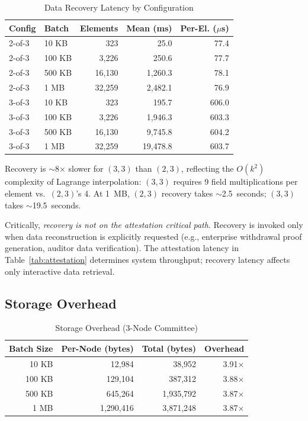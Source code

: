 \begin{table}[h]
\centering
\caption{Data Recovery Latency by Configuration}
\label{tab:recovery}
\begin{tabular}{llrrr}
\toprule
\textbf{Config} & \textbf{Batch} & \textbf{Elements} & \textbf{Mean (ms)} &
\textbf{Per-El. ($\mu$s)} \\
\midrule
2-of-3 & 10 KB  & 323    & 25.0     & 77.4  \\
2-of-3 & 100 KB & 3,226  & 250.6    & 77.7  \\
2-of-3 & 500 KB & 16,130 & 1,260.3  & 78.1  \\
2-of-3 & 1 MB   & 32,259 & 2,482.1  & 76.9  \\
\midrule
3-of-3 & 10 KB  & 323    & 195.7    & 606.0 \\
3-of-3 & 100 KB & 3,226  & 1,946.3  & 603.3 \\
3-of-3 & 500 KB & 16,130 & 9,745.8  & 604.2 \\
3-of-3 & 1 MB   & 32,259 & 19,478.8 & 603.7 \\
\bottomrule
\end{tabular}
\end{table}

Recovery is $\sim$8$\times$ slower for $(3,3)$ than $(2,3)$, reflecting the
$O(k^2)$ complexity of Lagrange interpolation: $(3,3)$ requires 9 field
multiplications per element vs.\ $(2,3)$'s 4. At 1~MB, $(2,3)$ recovery
takes $\sim$2.5~seconds; $(3,3)$ takes $\sim$19.5~seconds.

Critically, \emph{recovery is not on the attestation critical path}. Recovery
is invoked only when data reconstruction is explicitly requested (e.g.,
enterprise withdrawal proof generation, auditor data verification). The
attestation latency in Table~\ref{tab:attestation} determines system
throughput; recovery latency affects only interactive data retrieval.

\subsection{Storage Overhead}

\begin{table}[h]
\centering
\caption{Storage Overhead (3-Node Committee)}
\label{tab:storage}
\begin{tabular}{rrrr}
\toprule
\textbf{Batch Size} & \textbf{Per-Node (bytes)} & \textbf{Total (bytes)} &
\textbf{Overhead} \\
\midrule
10 KB  & 12,984    & 38,952    & 3.91$\times$ \\
100 KB & 129,104   & 387,312   & 3.88$\times$ \\
500 KB & 645,264   & 1,935,792 & 3.87$\times$ \\
1 MB   & 1,290,416 & 3,871,248 & 3.87$\times$ \\
\bottomrule
\end{tabular}
\end{table}

